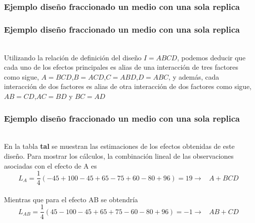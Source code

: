 \documentclass[12pt]{beamer}
\begin{document}
\begin{frame}
\frametitle{Ejemplo diseño fraccionado un medio con una sola replica}
\begin{table}[htbp]
  \centering
  \caption{Matriz de diseño $2^4$ fraccionado un medio}
  \label{tab:addlabel}%
\end{table}%
\end{frame}

\begin{frame}
\frametitle{Ejemplo diseño fraccionado un medio con una sola replica}

~\\Utilizando la relación de definición del diseño $I=ABCD$, podemos deducir que cada uno de los efectos principales es alias de una interacción de tres factores como sigue, $A=BCD$,$B=ACD$,$C=ABD$,$D=ABC$, y además, cada interacción de dos factores es alias de otra interacción de dos factores como sigue, $AB=CD$,$AC=BD$ y $BC=AD$
\end{frame}

\begin{frame}
\frametitle{Ejemplo diseño fraccionado un medio con una sola replica}
~\\En la tabla \textbf{tal} se muestran las estimaciones de los efectos obtenidas de este diseño. Para mostrar los cálculos, la combinación lineal de las observaciones asociadas con el efecto de A es
$$L_A=\frac{1}{4}(-45+100-45+65-75+60-80+96)=19 \rightarrow \;\;\; A+BCD $$
~\\Mientras que para el efecto AB se obtendría
$$L_{AB}=\frac{1}{4}(45-100-45+65+75-60-80+96)=-1 \rightarrow \;\;\; AB+CD $$

\end{frame}
\end{document}
